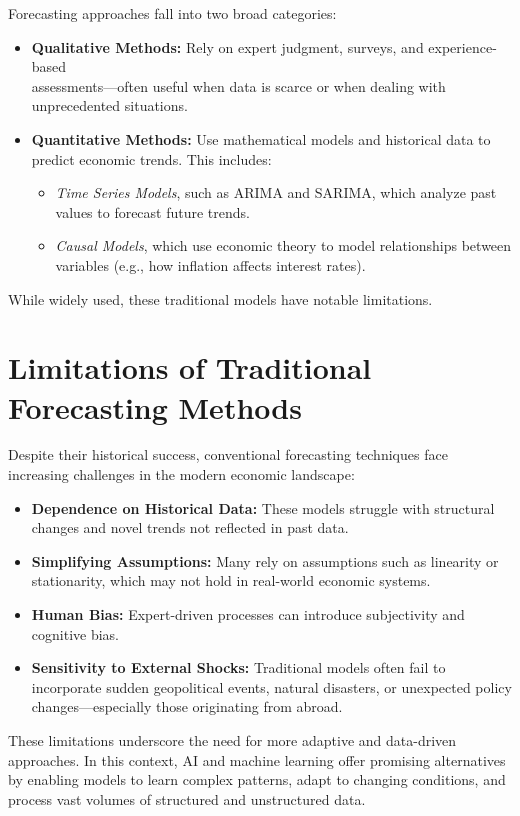 Forecasting approaches fall into two broad categories:

\begin{itemize}
    \item \textbf{Qualitative Methods:} Rely on expert judgment, surveys, and experience-based\\
          assessments—often useful when data is scarce or when dealing with unprecedented situations.
    \item \textbf{Quantitative Methods:} Use mathematical models and historical data to predict economic trends. This includes:
          \begin{itemize}
              \item \textit{Time Series Models}, such as ARIMA and SARIMA, which analyze past values to forecast future trends.
              \item \textit{Causal Models}, which use economic theory to model relationships between variables (e.g., how inflation affects interest rates).
          \end{itemize}
\end{itemize}

While widely used, these traditional models have notable limitations.

\section{Limitations of Traditional Forecasting Methods}
\label{sec:limitations-of-traditional-methods}

Despite their historical success, conventional forecasting techniques face increasing challenges in the modern economic landscape:

\begin{itemize}
    \item \textbf{Dependence on Historical Data:} These models struggle with structural changes and novel trends not reflected in past data.
    \item \textbf{Simplifying Assumptions:} Many rely on assumptions such as linearity or stationarity, which may not hold in real-world economic systems.
    \item \textbf{Human Bias:} Expert-driven processes can introduce subjectivity and cognitive bias.
    \item \textbf{Sensitivity to External Shocks:} Traditional models often fail to incorporate sudden geopolitical events, natural disasters, or unexpected policy changes—especially those originating from abroad. \citet{fastercapital2024}
\end{itemize}

These limitations underscore the need for more adaptive and data-driven approaches. In this context, AI and machine learning offer promising alternatives by enabling models to learn complex patterns, adapt to changing conditions, and process vast volumes of structured and unstructured data.
